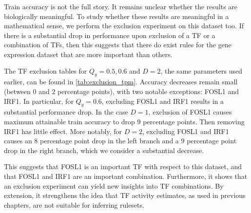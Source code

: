 \begin{table}[h]
    \centering
    \caption{Results for the full Broad dataset, using gene expression as input, for $C=1$ and small rules ($D=1,2,3$).}
    \label{tab:tpm_interpretable_results_C_1}
\end{table}

\begin{table}[h]
    \caption{Results for the full Broad dataset, using gene expression input, for $C=2$ and small rules ($D=1,2,3$).}
    \label{tab:tpm_interpretable_results_C_2}
\end{table}

Train accuracy is not the full story.
It remains unclear whether the results are biologically meaningful.
To study whether these results are meaningful in a mathematical sense,
we perform the exclusion experiment on this dataset too.
If there is a substantial drop in performance upon exclusion of a TF or a combination of TFs,
then this suggests that there do exist rules for the gene expression dataset that are more important than others.

The TF exclusion tables for $Q_y=0.5,0.6$ and $D=2$, the same parameters used earlier,
can be found in \autoref{tab:exclusion_tpm}.
Accuracy decreases remain small (between $0$ and $2$ percentage points), with two notable exceptions:
FOSL1 and IRF1.
In particular, for $Q_y=0.6$, excluding FOSL1 and IRF1 results in a substantial performance drop.
In the case $D=1$, exclusion of FOSL1 causes maximum attainable train accuracy to drop $9$ percentage points.
Then removing IRF1 has little effect.
More notably, for $D=2$, excluding FOSL1 and IRF1 causes an $8$ percentage point drop in the left branch and a
$9$ percentage point drop in the right branch, which we consider a substantial decrease.

This suggests that FOSL1 is an important TF with respect to this dataset, and that FOSL1 and IRF1 are an important
combination.
Furthermore, it shows that an exclusion experiment can yield new insights into TF combinations.
By extension, it strengthens the idea that TF activity estimates, as used in previous chapters,
are not suitable for inferring rulesets.

